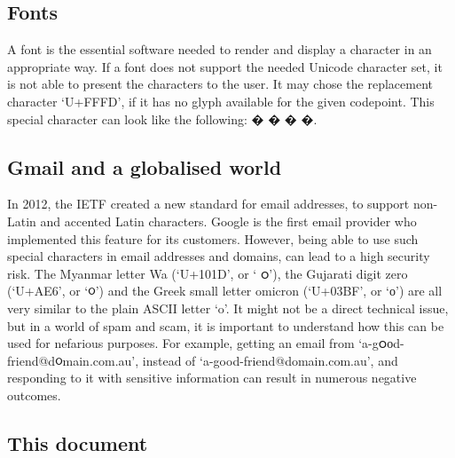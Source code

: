 \documentclass[a4paper, 12pt]{scrartcl} %
\begin{document}
\subsection{Fonts}

A font is the essential software needed to render and display a character in an
appropriate way. If a font does not support the needed Unicode character set, it
is not able to present the characters to the user. It may chose the replacement
character `U+FFFD', if it has no \gls{glyph} available for the given \gls{codepoint}.
This special character can look like the following: {\mongolian �}
{\chineset￰�} {\arial￰�} {\dejavu￰�}.

\subsection{Gmail and a globalised world}

In 2012, the \gls{IETF} created a new standard for email addresses, to support
non-Latin and accented Latin characters. Google is the first email provider
who implemented this feature for its customers. \cite{gmailglobal} However,
being able to use such special characters in email addresses and domains, can
lead to a high security risk. The Myanmar letter Wa (`U+101D', or `{\myanmar
ဝ}'), the Gujarati digit zero (`U+AE6', or `{\gujarati ૦}') and the Greek small
letter omicron (`U+03BF', or `{\droid ο}') are all very similar to the plain
\gls{ASCII} letter `o'. It might not be a direct technical issue, but in a
world of \gls{spam} and \gls{scam}, it is important to understand how this can
be used for nefarious purposes. For example, getting an email from
`a-g{\myanmar ဝ}{\droid ο}d-friend@d{\gujarati ૦}main.com.au', instead of
`a-good-friend@domain.com.au', and responding to it with sensitive information
can result in numerous negative outcomes. \cite{gmailprotectglobal}

\subsection{This document}
\end{document}
